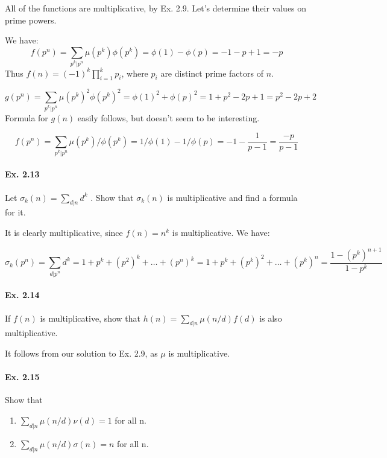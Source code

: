 \documentclass[notitlepage]{article}
\theoremstyle{definition}
\begin{document}
All of the functions are multiplicative, by Ex. 2.9. Let's determine their values on prime powers.

We have:
\begin{equation}
  f(p^n) = \sum_{p^k|p^n} \mu(p^k) \phi(p^k) = \phi(1) - \phi(p) = -1 - p + 1 = -p
\end{equation}
Thus $f(n) = (-1)^k \prod_{i=1}^k p_i$, where $p_i$ are distinct prime factors of $n$.

\begin{equation}
  g(p^n) = \sum_{p^k|p^n} \mu(p^k)^2 \phi(p^k)^2 = \phi(1)^2 + \phi(p)^2 = 1 + p^2 - 2p + 1 = p^2 - 2p + 2
\end{equation}
Formula for $g(n)$ easily follows, but doesn't seem to be interesting.

\begin{equation}
  f(p^n) = \sum_{p^k|p^n} \mu(p^k)/ \phi(p^k) = 1/\phi(1) - 1/\phi(p)
  = -1 - \frac{1}{p - 1} = \frac{-p}{p-1}
\end{equation}

\paragraph{Ex. 2.13}
Let $\sigma_k(n) = \sum_{d|n} d^k$ . Show that $\sigma_k(n)$ is
multiplicative and find a formula for it.

It is clearly multiplicative, since $f(n) = n^k$ is multiplicative. We have:

\begin{equation}
  \sigma_k(p^n) = \sum_{d|p^n} d^k = 1 + p^k + (p^2)^k + \ldots + (p^n)^k = 1 + p^k + (p^k)^2 + \ldots + (p^k)^n = \frac{1-(p^k)^{n+1}}{1-p^k}
\end{equation}

\paragraph{Ex. 2.14}
If $f(n)$ is multiplicative, show that $h(n) = \sum_{d|n} \mu(n/d)f(d)$ is also multiplicative.

It follows from our solution to Ex. 2.9, as $\mu$ is multiplicative.

\paragraph{Ex. 2.15}
Show that
\begin{enumerate}[a]
  \item $\sum_{d|n} \mu(n/d)\nu(d) = 1$ for all n.
  \item $\sum_{d|n} \mu(n/d) \sigma(n) = n$ for all n.
\end{enumerate}
\end{document}
